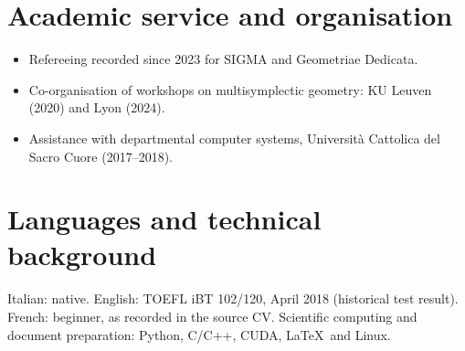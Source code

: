 \documentclass[11pt,a4paper]{article}
\begin{document}
\section*{Academic service and organisation}
\begin{itemize}
\item Refereeing recorded since 2023 for SIGMA and Geometriae Dedicata.
\item Co-organisation of workshops on multisymplectic geometry: KU Leuven (2020) and Lyon (2024).
\item Assistance with departmental computer systems, Universit\`a Cattolica del Sacro Cuore (2017--2018).
\end{itemize}
\section*{Languages and technical background}
Italian: native. English: TOEFL iBT 102/120, April 2018 (historical test result). French: beginner, as recorded in the source CV. Scientific computing and document preparation: Python, C/C++, CUDA, \LaTeX\ and Linux.
\end{document}
